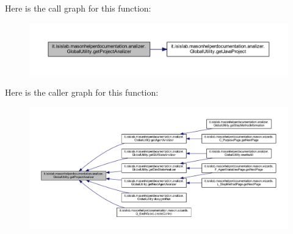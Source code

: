 Here is the call graph for this function\-:\nopagebreak
\begin{figure}[H]
\begin{center}
\leavevmode
\includegraphics[width=350pt]{classit_1_1isislab_1_1masonhelperdocumentation_1_1analizer_1_1_global_utility_af6bcca0c06ec6fa8c2b2b88f5050914c_cgraph}
\end{center}
\end{figure}




Here is the caller graph for this function\-:\nopagebreak
\begin{figure}[H]
\begin{center}
\leavevmode
\includegraphics[width=350pt]{classit_1_1isislab_1_1masonhelperdocumentation_1_1analizer_1_1_global_utility_af6bcca0c06ec6fa8c2b2b88f5050914c_icgraph}
\end{center}
\end{figure}


